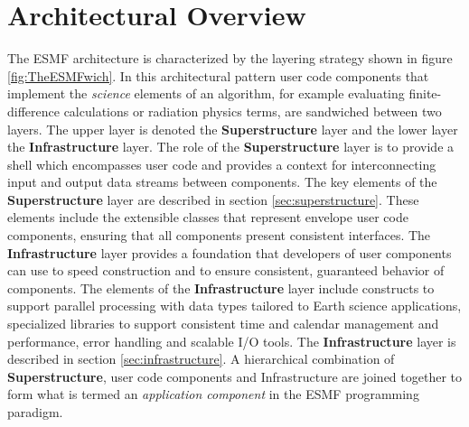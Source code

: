 
\section{Architectural Overview}
\label{sec:architecture}
The ESMF architecture is characterized by the layering strategy shown in figure \ref{fig:TheESMFwich}. In this architectural pattern user code components that implement the {\it science} elements of an algorithm, for example evaluating
finite-difference calculations or radiation physics terms, are sandwiched between two layers. The upper layer is
denoted the {\bf Superstructure} layer and the lower layer the {\bf Infrastructure} layer. The role of the {\bf Superstructure}
layer is to provide a shell which encompasses user code and provides a context for interconnecting input and output
data streams between components. The key elements of the {\bf Superstructure} layer are described in section \ref{sec:superstructure}.
These elements include the extensible classes that represent envelope user code components, ensuring that all
components present consistent interfaces. The {\bf Infrastructure} layer provides a foundation that developers of
user components can use to speed construction and to ensure consistent, guaranteed behavior of components.
The elements of the {\bf Infrastructure} layer include constructs to support parallel processing with data types tailored
to Earth science applications, specialized libraries to support consistent time and calendar management and
performance, error handling and scalable I/O tools. The {\bf Infrastructure} layer is described in section \ref{sec:infrastructure}.
A hierarchical combination of {\bf Superstructure}, user code components and Infrastructure are joined together
to form what is termed an {\it application component} in the ESMF programming paradigm.
